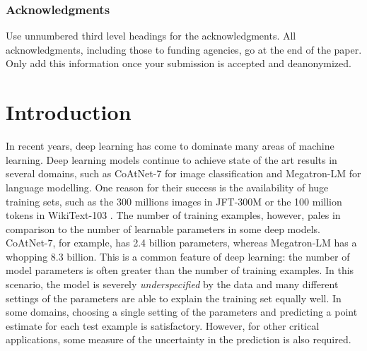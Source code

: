\documentclass[10pt]{article} %
\begin{document}
\subsubsection*{Acknowledgments}
Use unnumbered third level headings for the acknowledgments. All
acknowledgments, including those to funding agencies, go at the end of the paper.
Only add this information once your submission is accepted and deanonymized. 


\section{Introduction}

In recent years, deep learning \citep{goodfellow2016deep} has come to dominate many areas of machine learning. Deep learning models continue to achieve state of the art results in several domains, such as CoAtNet-7 \citep{dai2021} for image classification and Megatron-LM \citep{shoeybi2019} for language modelling. One reason for their success is the availability of huge training sets, such as the 300 millions images in JFT-300M \citep{sun2017} or the 100 million tokens in WikiText-103 \citep{merity2016}. The number of training examples, however, pales in comparison to the number of learnable parameters in some deep models. CoAtNet-7, for example, has 2.4 billion parameters, whereas Megatron-LM has a whopping 8.3 billion. This is a common feature of deep learning: the number of model parameters is often greater than the number of training examples. In this scenario, the model is severely \emph{underspecified} by the data and many different settings of the parameters are able to explain the training set equally well. In some domains, choosing a single setting of the parameters and predicting a point estimate for each test example is satisfactory. However, for other critical applications, some measure of the uncertainty in the prediction is also required. 
\end{document}
